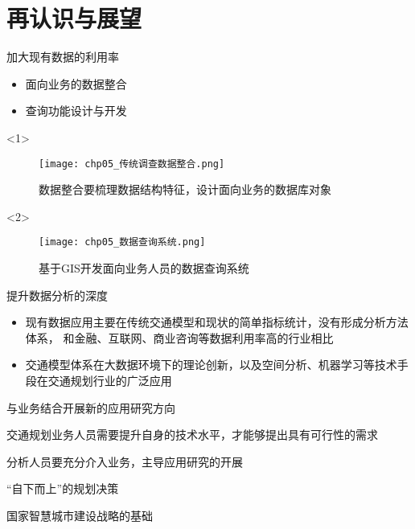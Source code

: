 

\section{再认识与展望}

\begin{frame}[t]{加大现有数据的利用率}
\begin{itemize}
\item<1-> 面向业务的数据整合
\item<2-> 查询功能设计与开发
\end{itemize}

\begin{overlayarea}{\textwidth}{\textheight}
  \begin{onlyenv}<1>
\begin{figure}
  \centering
  \texttt{[image: chp05\_传统调查数据整合.png]}
  \caption{数据整合要梳理数据结构特征，设计面向业务的数据库对象}
\end{figure}
  \end{onlyenv}

\vspace{-15pt}
  \begin{onlyenv}<2>
\begin{figure}
  \centering
  \texttt{[image: chp05\_数据查询系统.png]}
  \caption{基于GIS开发面向业务人员的数据查询系统}
\end{figure}
  \end{onlyenv}
\end{overlayarea}
\end{frame}

\begin{frame}[t]{提升数据分析的深度}
\begin{itemize}
\item<1-> 现有数据应用主要在传统交通模型和现状的简单指标统计，没有形成分析方法体系，
和金融、互联网、商业咨询等数据利用率高的行业相比
\item<2-> 交通模型体系在大数据环境下的理论创新，以及空间分析、机器学习等技术手段在交通规划行业的广泛应用
\end{itemize}

\end{frame}

\begin{frame}[t]{与业务结合开展新的应用研究方向}
\item 交通规划业务人员需要提升自身的技术水平，才能够提出具有可行性的需求
\item 分析人员要充分介入业务，主导应用研究的开展
\end{frame}

\begin{frame}[t]{“自下而上”的规划决策}

\end{frame}

\begin{frame}[t]{国家智慧城市建设战略的基础}

\end{frame}


